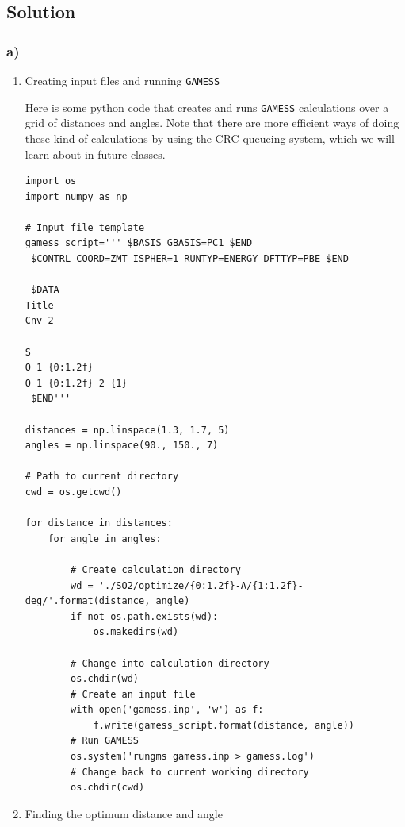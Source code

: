 \documentclass[11pt]{article}
\begin{document}
\subsection{Solution}
\label{sec-3-1}

\subsubsection{a)}
\label{sec-3-1-1}


\begin{enumerate}
\item Creating input files and running \texttt{GAMESS}
\label{sec-3-1-1-1}

Here is some python code that creates and runs \texttt{GAMESS} calculations over a grid of distances and angles. Note that there are more efficient ways of doing these kind of calculations by using the CRC queueing system, which we will learn about in future classes.

\begin{verbatim}
import os
import numpy as np

# Input file template
gamess_script=''' $BASIS GBASIS=PC1 $END
 $CONTRL COORD=ZMT ISPHER=1 RUNTYP=ENERGY DFTTYP=PBE $END

 $DATA 
Title
Cnv 2

S    
O 1 {0:1.2f} 
O 1 {0:1.2f} 2 {1}
 $END'''

distances = np.linspace(1.3, 1.7, 5)
angles = np.linspace(90., 150., 7)

# Path to current directory
cwd = os.getcwd()

for distance in distances:
    for angle in angles:
        
        # Create calculation directory
        wd = './SO2/optimize/{0:1.2f}-A/{1:1.2f}-deg/'.format(distance, angle)
        if not os.path.exists(wd):
            os.makedirs(wd)

        # Change into calculation directory
        os.chdir(wd)
        # Create an input file
        with open('gamess.inp', 'w') as f:
            f.write(gamess_script.format(distance, angle))     
        # Run GAMESS   
        os.system('rungms gamess.inp > gamess.log')
        # Change back to current working directory
        os.chdir(cwd)
\end{verbatim}


\item Finding the optimum distance and angle
\label{sec-3-1-1-2}


\end{enumerate}
\end{document}
